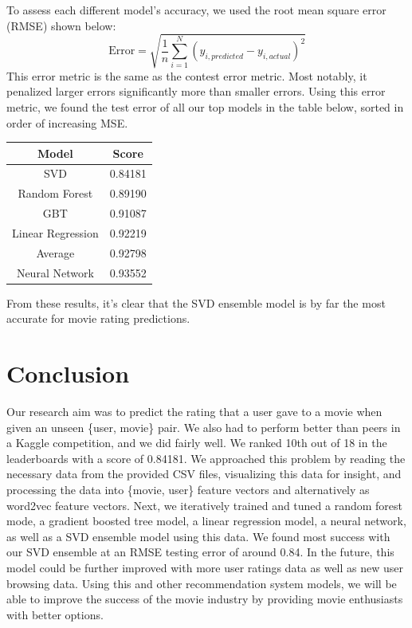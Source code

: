 \documentclass{sig-alternate-05-2015}
\begin{document}
To assess each different model's accuracy, we used the root mean square error (RMSE) shown below:
\[\text{Error}=\sqrt{\frac{1}{n}\sum_{i=1}^N (y_{i,predicted}-y_{i,actual})^2}\]
This error metric is the same as the contest error metric. Most notably, it penalized larger errors significantly more than smaller errors.
Using this error metric, we found the test error of all our top models in the table below, sorted in order of increasing MSE.
\begin{center}
    \begin{tabular}{c|c}
         Model & Score\\
         \hline
         SVD & 0.84181\\
         Random Forest & 0.89190\\
         GBT & 0.91087\\
         Linear Regression & 0.92219\\
         Average & 0.92798\\
         Neural Network & 0.93552
    \end{tabular}
\end{center}
From these results, it's clear that the SVD ensemble model is by far the most accurate for movie rating predictions.

\section{Conclusion}

Our research aim was to predict the rating that a user gave to a movie when given an unseen \{user, movie\} pair.
We also had to perform better than peers in a Kaggle competition, and we did fairly well. We ranked 10th out
of 18 in the leaderboards with a score of  0.84181. We approached this problem by reading the necessary data from the provided CSV files,
visualizing this data for insight, and processing the data into \{movie, user\} feature vectors and alternatively
as word2vec feature vectors. Next, we iteratively trained and tuned a random forest mode, a gradient boosted tree
model, a linear regression model, a neural network, as well as a SVD ensemble model using this data. We found most
success with our SVD ensemble at an RMSE testing error of around 0.84. In the future, this model could be further
improved with more user ratings data as well as new user browsing data. Using this and other recommendation system
models, we will be able to improve the success of the movie industry by providing movie enthusiasts with better options.
\end{document}
